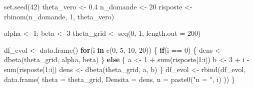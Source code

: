 \documentclass[
  letterpaper,
  DIV=11,
  numbers=noendperiod,
  oneside]{scrreprt}
\newenvironment{Shaded}{\begin{snugshade}}{\end{snugshade}}
\newcommand{\AttributeTok}[1]{\textcolor[rgb]{0.40,0.45,0.13}{#1}}
\newcommand{\ControlFlowTok}[1]{\textcolor[rgb]{0.00,0.23,0.31}{\textbf{#1}}}
\newcommand{\DecValTok}[1]{\textcolor[rgb]{0.68,0.00,0.00}{#1}}
\newcommand{\FloatTok}[1]{\textcolor[rgb]{0.68,0.00,0.00}{#1}}
\newcommand{\FunctionTok}[1]{\textcolor[rgb]{0.28,0.35,0.67}{#1}}
\newcommand{\NormalTok}[1]{\textcolor[rgb]{0.00,0.23,0.31}{#1}}
\newcommand{\OtherTok}[1]{\textcolor[rgb]{0.00,0.23,0.31}{#1}}
\newcommand{\SpecialCharTok}[1]{\textcolor[rgb]{0.37,0.37,0.37}{#1}}
\newcommand{\StringTok}[1]{\textcolor[rgb]{0.13,0.47,0.30}{#1}}
\theoremstyle{definition}
\theoremstyle{plain}
\theoremstyle{definition}
\theoremstyle{remark}
\begin{document}
\begin{Shaded}
\begin{Highlighting}[]
\FunctionTok{set.seed}\NormalTok{(}\DecValTok{42}\NormalTok{)}
\NormalTok{theta\_vero }\OtherTok{\textless{}{-}} \FloatTok{0.4}
\NormalTok{n\_domande }\OtherTok{\textless{}{-}} \DecValTok{20}
\NormalTok{risposte }\OtherTok{\textless{}{-}} \FunctionTok{rbinom}\NormalTok{(n\_domande, }\DecValTok{1}\NormalTok{, theta\_vero)}

\NormalTok{alpha }\OtherTok{\textless{}{-}} \DecValTok{1}\NormalTok{; beta }\OtherTok{\textless{}{-}} \DecValTok{3}
\NormalTok{theta\_grid }\OtherTok{\textless{}{-}} \FunctionTok{seq}\NormalTok{(}\DecValTok{0}\NormalTok{, }\DecValTok{1}\NormalTok{, }\AttributeTok{length.out =} \DecValTok{200}\NormalTok{)}

\NormalTok{df\_evol }\OtherTok{\textless{}{-}} \FunctionTok{data.frame}\NormalTok{()}
\ControlFlowTok{for}\NormalTok{(i }\ControlFlowTok{in} \FunctionTok{c}\NormalTok{(}\DecValTok{0}\NormalTok{, }\DecValTok{5}\NormalTok{, }\DecValTok{10}\NormalTok{, }\DecValTok{20}\NormalTok{)) \{}
  \ControlFlowTok{if}\NormalTok{(i }\SpecialCharTok{==} \DecValTok{0}\NormalTok{) \{}
\NormalTok{    dens }\OtherTok{\textless{}{-}} \FunctionTok{dbeta}\NormalTok{(theta\_grid, alpha, beta)}
\NormalTok{  \} }\ControlFlowTok{else}\NormalTok{ \{}
\NormalTok{    a }\OtherTok{\textless{}{-}} \DecValTok{1} \SpecialCharTok{+} \FunctionTok{sum}\NormalTok{(risposte[}\DecValTok{1}\SpecialCharTok{:}\NormalTok{i])}
\NormalTok{    b }\OtherTok{\textless{}{-}} \DecValTok{3} \SpecialCharTok{+}\NormalTok{ i }\SpecialCharTok{{-}} \FunctionTok{sum}\NormalTok{(risposte[}\DecValTok{1}\SpecialCharTok{:}\NormalTok{i])}
\NormalTok{    dens }\OtherTok{\textless{}{-}} \FunctionTok{dbeta}\NormalTok{(theta\_grid, a, b)}
\NormalTok{  \}}
\NormalTok{  df\_evol }\OtherTok{\textless{}{-}} \FunctionTok{rbind}\NormalTok{(df\_evol, }\FunctionTok{data.frame}\NormalTok{(}
    \AttributeTok{theta =}\NormalTok{ theta\_grid, }\AttributeTok{Densita =}\NormalTok{ dens, }\AttributeTok{n =} \FunctionTok{paste0}\NormalTok{(}\StringTok{"n = "}\NormalTok{, i)}
\NormalTok{  ))}
\NormalTok{\}}


\end{Highlighting}
\end{Shaded}
\end{document}
